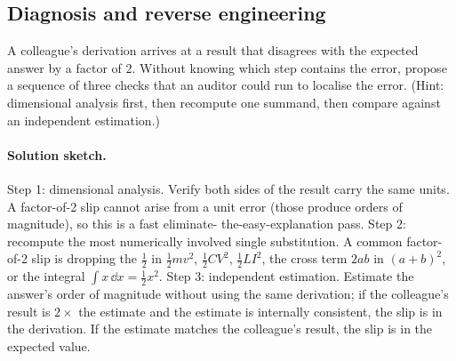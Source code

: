 \subsection*{Diagnosis and reverse engineering}

\begin{exercise}
A colleague's derivation arrives at a result that disagrees with the
expected answer by a factor of $2$. Without knowing which step
contains the error, propose a sequence of three checks that an
auditor could run to localise the error. (Hint: dimensional analysis
first, then recompute one summand, then compare against an
independent estimation.)

\paragraph{Solution sketch.}
Step 1: dimensional analysis. Verify both sides of the result carry
the same units. A factor-of-2 slip cannot arise from a unit error
(those produce orders of magnitude), so this is a fast eliminate-
the-easy-explanation pass. Step 2: recompute the most numerically
involved single substitution. A common factor-of-2 slip is dropping
the $\tfrac{1}{2}$ in $\tfrac{1}{2} m v^{2}$, $\tfrac{1}{2} C V^{2}$,
$\tfrac{1}{2} L I^{2}$, the cross term $2 a b$ in $(a + b)^{2}$, or
the integral $\int x \,\dd x = \tfrac{1}{2} x^{2}$. Step 3:
independent estimation. Estimate the answer's order of magnitude
without using the same derivation; if the colleague's result is
$2 \times$ the estimate and the estimate is internally consistent,
the slip is in the derivation. If the estimate matches the
colleague's result, the slip is in the expected value.
\end{exercise}

